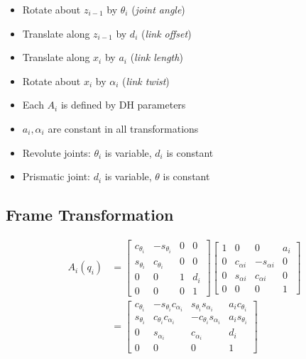   \begin{itemize}
    \item Rotate about $ z_{i - 1} $ by $ \theta_{i} $ (\emph{joint angle})
    \item Translate along $ z_{i - 1} $ by $ d_{i} $ (\emph{link offset})
    \item Translate along $ x_{i} $ by $ a_{i} $ (\emph{link length})
    \item Rotate about $ x_{i} $ by $ \alpha_{i} $ (\emph{link twist})
    \item Each $ A_{i} $ is defined by DH parameters
    \item $ a_{i}, \alpha_{i} $ are constant in all transformations
    \item Revolute joints: $ \theta_{i} $ is variable, $ d_{i} $ is constant
    \item Prismatic joint: $ d_{i} $ is variable, $ \theta $ is constant
  \end{itemize}

  \subsection{Frame Transformation}

    \begin{align}
      A_{i}\left( q_{i} \right)
        &=
        \begin{bmatrix}
          c_{\theta_{i}} & -s_{\theta_{i}} & 0 & 0 \\
          s_{\theta_{i}} & c_{\theta_{i}} & 0 & 0 \\
          0 & 0 & 1 & d_{i} \\
          0 & 0 & 0 & 1
        \end{bmatrix}
        \begin{bmatrix}
          1 & 0 & 0 & a_{i} \\
          0 & c_{\alpha{i}} & -s_{\alpha{i}} & 0 \\
          0 & s_{\alpha{i}} & c_{\alpha{i}} & 0 \\
          0 & 0 & 0 & 1
        \end{bmatrix} \\
        &=
        \begin{bmatrix}
          c_{\theta_{i}} & -s_{\theta_{i}} c_{\alpha_{i}} & s_{\theta_{i}} s_{\alpha_{i}} & a_{i} c_{\theta_{i}} \\
          s_{\theta_{i}} & c_{\theta_{i}} c_{\alpha_{i}} & -c_{\theta_{i}} s_{\alpha_{i}} & a_{i} s_{\theta_{i}} \\
          0 & s_{\alpha_{i}} & c_{\alpha_{i}} & d_{i} \\
          0 & 0 & 0 & 1
        \end{bmatrix}
    \end{align}


